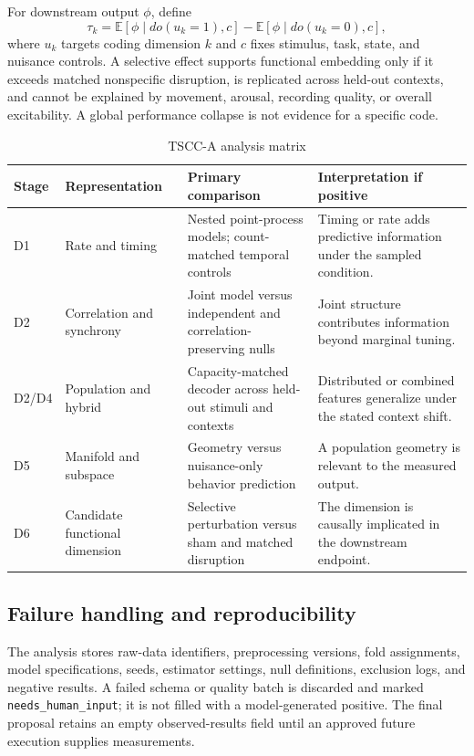 \documentclass[conference]{IEEEtran}
\begin{document}
For downstream output $\phi$, define
\begin{equation}
\tau_k=\mathbb E[\phi\mid do(u_k=1),c]-\mathbb E[\phi\mid do(u_k=0),c],
\end{equation}
where $u_k$ targets coding dimension $k$ and $c$ fixes stimulus, task, state, and nuisance controls. A selective effect supports functional embedding only if it exceeds matched nonspecific disruption, is replicated across held-out contexts, and cannot be explained by movement, arousal, recording quality, or overall excitability. A global performance collapse is not evidence for a specific code.

\begin{table}[t]
\caption{TSCC-A analysis matrix}
\label{tab:matrix}
\centering
\footnotesize
\begin{tabular}{p{}p{}p{}p{}}
\toprule
Stage & Representation & Primary comparison & Interpretation if positive \\
\midrule
D1 & Rate and timing & Nested point-process models; count-matched temporal controls & Timing or rate adds predictive information under the sampled condition. \\
D2 & Correlation and synchrony & Joint model versus independent and correlation-preserving nulls & Joint structure contributes information beyond marginal tuning. \\
D2/D4 & Population and hybrid & Capacity-matched decoder across held-out stimuli and contexts & Distributed or combined features generalize under the stated context shift. \\
D5 & Manifold and subspace & Geometry versus nuisance-only behavior prediction & A population geometry is relevant to the measured output. \\
D6 & Candidate functional dimension & Selective perturbation versus sham and matched disruption & The dimension is causally implicated in the downstream endpoint. \\
\bottomrule
\end{tabular}
\end{table}

\subsection{Failure handling and reproducibility}
The analysis stores raw-data identifiers, preprocessing versions, fold assignments, model specifications, seeds, estimator settings, null definitions, exclusion logs, and negative results. A failed schema or quality batch is discarded and marked \texttt{needs\_human\_input}; it is not filled with a model-generated positive. The final proposal retains an empty observed-results field until an approved future execution supplies measurements.
\end{document}
